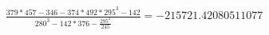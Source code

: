 \documentclass{article}
\begin{document}
\begin{align*}
  \frac{379 * 457 - 346 - 374 * 492 * 295 ^ 3 - 142 }{280 ^ 3 - 142 * 376 - \frac {295^2}   {245} } = -215721.42080511077
\end{align*}
\end{document}
